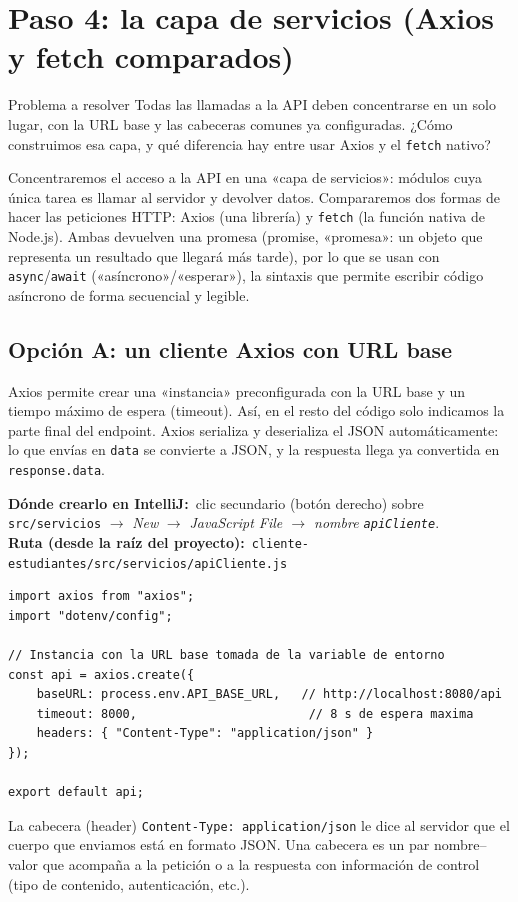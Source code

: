 \documentclass[11pt]{article}
\newcommand{\dondecrear}[3]{\begin{ubic}{\footnotesize\textbf{\color{ndverdeo}D\'onde crearlo en IntelliJ:}~clic secundario (bot\'on derecho) sobre \texttt{#1} $\rightarrow$ \emph{New} $\rightarrow$ \emph{#2}.\\[2pt]\textbf{\color{ndverdeo}Ruta (desde la ra\'iz del proyecto):}~\texttt{#3}}\end{ubic}\nobreak\vspace{3pt}}
\begin{document}
\section{Paso 4: la capa de servicios (Axios y fetch comparados)}
\begin{cajaproblema}{Problema a resolver}
Todas las llamadas a la API deben concentrarse en un solo lugar, con la URL base y las cabeceras comunes ya configuradas. ¿Cómo construimos esa capa, y qué diferencia hay entre usar Axios y el \texttt{fetch} nativo?\par
\end{cajaproblema}
Concentraremos el acceso a la API en una «capa de servicios»: módulos cuya única tarea es llamar al servidor y devolver datos. Compararemos dos formas de hacer las peticiones HTTP: Axios (una librería) y \texttt{fetch} (la función nativa de Node.js). Ambas devuelven una promesa (promise, «promesa»: un objeto que representa un resultado que llegará más tarde), por lo que se usan con \texttt{async}/\texttt{await} («asíncrono»/«esperar»), la sintaxis que permite escribir código asíncrono de forma secuencial y legible.

\subsection{Opción A: un cliente Axios con URL base}
Axios permite crear una «instancia» preconfigurada con la URL base y un tiempo máximo de espera (timeout). Así, en el resto del código solo indicamos la parte final del endpoint. Axios serializa y deserializa el JSON automáticamente: lo que envías en \texttt{data} se convierte a JSON, y la respuesta llega ya convertida en \texttt{response.\allowbreak{}data}.

\dondecrear{src/servicios}{JavaScript File $\rightarrow$ nombre \texttt{apiCliente}}{cliente-estudiantes/src/servicios/apiCliente.js}
\begin{cajacodigo}
\begin{lstlisting}[style=js]
import axios from "axios";
import "dotenv/config";

// Instancia con la URL base tomada de la variable de entorno
const api = axios.create({
	baseURL: process.env.API_BASE_URL,   // http://localhost:8080/api
	timeout: 8000,                        // 8 s de espera maxima
	headers: { "Content-Type": "application/json" }
});

export default api;
\end{lstlisting}
\end{cajacodigo}
\vspace{2pt}
La cabecera (header) \texttt{Content-\allowbreak{}Type: application/\allowbreak{}json} le dice al servidor que el cuerpo que enviamos está en formato JSON. Una cabecera es un par nombre--valor que acompaña a la petición o a la respuesta con información de control (tipo de contenido, autenticación, etc.).
\end{document}
